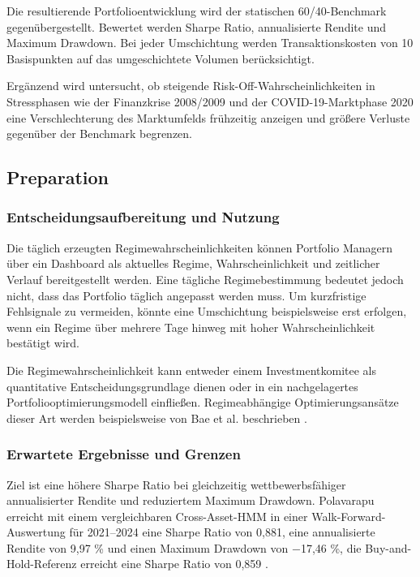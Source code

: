 \vspace{0.5cm}

Die resultierende Portfolioentwicklung wird der statischen 60/40-Benchmark gegenübergestellt. Bewertet werden Sharpe Ratio, annualisierte Rendite und Maximum Drawdown. Bei jeder Umschichtung werden Transaktionskosten von 10 Basispunkten auf das umgeschichtete Volumen berücksichtigt.

\vspace{0.5cm}

Ergänzend wird untersucht, ob steigende Risk-Off-Wahrscheinlichkeiten in Stressphasen wie der Finanzkrise 2008/2009 und der COVID-19-Marktphase 2020 eine Verschlechterung des Marktumfelds frühzeitig anzeigen und größere Verluste gegenüber der Benchmark begrenzen.


\subsection{Preparation}
\subsubsection{Entscheidungsaufbereitung und Nutzung}
Die täglich erzeugten Regimewahrscheinlichkeiten können Portfolio Managern über ein Dashboard als aktuelles Regime, Wahrscheinlichkeit und zeitlicher Verlauf bereitgestellt werden. Eine tägliche Regimebestimmung bedeutet jedoch nicht, dass das Portfolio täglich angepasst werden muss. Um kurzfristige Fehlsignale zu vermeiden, könnte eine Umschichtung beispielsweise erst erfolgen, wenn ein Regime über mehrere Tage hinweg mit hoher Wahrscheinlichkeit bestätigt wird.

\vspace{0.5cm}

Die Regimewahrscheinlichkeit kann entweder einem Investmentkomitee als quantitative Entscheidungsgrundlage dienen oder in ein nachgelagertes Portfoliooptimierungsmodell einfließen. Regimeabhängige Optimierungsansätze dieser Art werden beispielsweise von Bae et al. beschrieben \cite{BAE2014450}.

\subsubsection{Erwartete Ergebnisse und Grenzen}
Ziel ist eine höhere Sharpe Ratio bei gleichzeitig wettbewerbsfähiger annualisierter Rendite und reduziertem Maximum Drawdown. Polavarapu erreicht mit einem vergleichbaren Cross-Asset-HMM in einer Walk-Forward-Auswertung für 2021–2024 eine Sharpe Ratio von 0,881, eine annualisierte Rendite von 9,97 \% und einen Maximum Drawdown von −17,46 \%, die Buy-and-Hold-Referenz erreicht eine Sharpe Ratio von 0,859 \cite{polavarapu_cross-asset_2026}.

